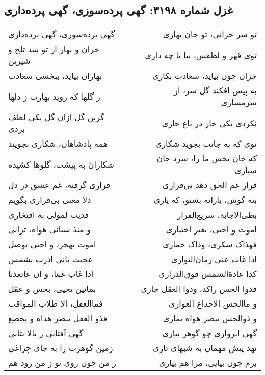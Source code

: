 \begin{center}
\section*{غزل شماره ۳۱۹۸: گهی پرده‌سوزی، گهی پرده‌داری}
\label{sec:3198}
\begin{longtable}{l p{0.5cm} r}
گهی پرده‌سوزی، گهی پرده‌داری
&&
تو سر خزانی، تو جان بهاری
\\
خزان و بهار از تو شد تلخ و شیرین
&&
توی قهر و لطفش، بیا تا چه داری
\\
بهاران بیاید، ببخشی سعادت
&&
خزان چون بیاید، سعادت بکاری
\\
ز گلها که روید بهارت ز دلها
&&
به پیش افکند گل سر، از شرمساری
\\
گرین گل ازان گل یکی لطف بردی
&&
نکردی یکی خار در باغ خاری
\\
همه پادشاهان، شکاری بجویند
&&
توی که به جانت بجوید شکاری
\\
شکاران به پیشت، گلوها کشیده
&&
که جان بخش ما را، سزد جان سپاری
\\
قراری گرفته، غم عشق در دل
&&
قرار غم الحق دهد بی‌قراری
\\
دلا معنی بی‌قراری بگویم
&&
بنه گوش، یارانه بشنو، که یاری
\\
فدیت لمولی به افتخاری
&&
بطی‌الاجابة، سریع‌الفرار
\\
و منذ سبانی هواه، ترانی
&&
اموت و احیی، بغیر اختیاری
\\
اموت بهجر، و احیی بوصل
&&
فهذاک سکری، وذاک خماری
\\
عجبت بانی اذرب بشمس
&&
اذا غاب عنی زمان‌التواری
\\
اذا غاب غبنا، و ان عاتعدنا
&&
کذا عادةالشمس فوق‌الذراری
\\
بمائین یحیی، بحس و عقل
&&
فذوا الحس راکد، وذوا العقل جاری
\\
فماالعقل، الا طلاب المواقب
&&
و ماالحس الاخداع العواری
\\
فذو العقل یبصر هداه و یخضع
&&
و ذوالحس یبصر هواه یماری
\\
گهی آفتابی ز بالا بتابی
&&
گهی ابرواری چو گوهر بباری
\\
زمین گوهرت را به جای چراغی
&&
نهد پیش مهمان به شبهای تاری
\\
ز من چون روی تو ز من رود هم
&&
برم چون بیایی، مرا هم بیاری
\\
\end{longtable}
\end{center}
